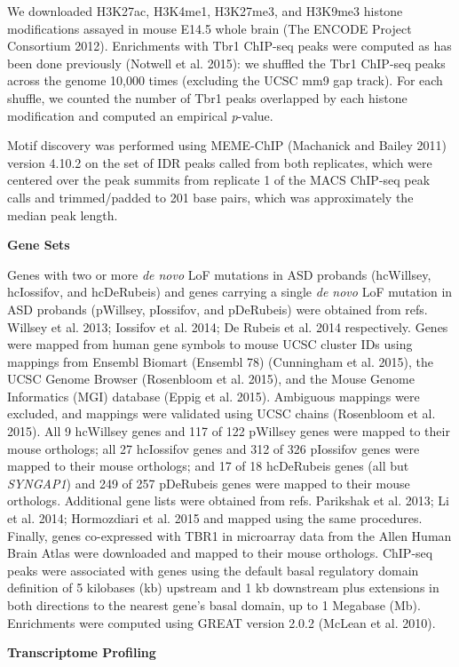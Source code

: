 \documentclass[]{article}
\begin{document}
We downloaded H3K27ac, H3K4me1, H3K27me3, and H3K9me3 histone
modifications assayed in mouse E14.5 whole brain (The ENCODE Project
Consortium 2012). Enrichments with Tbr1 ChIP-seq peaks were computed as
has been done previously (Notwell et al. 2015): we shuffled the Tbr1
ChIP-seq peaks across the genome 10,000 times (excluding the UCSC mm9
gap track). For each shuffle, we counted the number of Tbr1 peaks
overlapped by each histone modification and computed an empirical
\emph{p}-value.

Motif discovery was performed using MEME-ChIP (Machanick and Bailey
2011) version 4.10.2 on the set of IDR peaks called from both
replicates, which were centered over the peak summits from replicate 1
of the MACS ChIP-seq peak calls and trimmed/padded to 201 base pairs,
which was approximately the median peak length.

\textbf{Gene Sets}

Genes with two or more \emph{de novo} LoF mutations in ASD probands
(hcWillsey, hcIossifov, and hcDeRubeis) and genes carrying a single
\emph{de novo} LoF mutation in ASD probands (pWillsey, pIossifov, and
pDeRubeis) were obtained from refs. Willsey et al. 2013; Iossifov et al.
2014; De Rubeis et al. 2014 respectively. Genes were mapped from human
gene symbols to mouse UCSC cluster IDs using mappings from Ensembl
Biomart (Ensembl 78) (Cunningham et al. 2015), the UCSC Genome Browser
(Rosenbloom et al. 2015), and the Mouse Genome Informatics (MGI)
database (Eppig et al. 2015). Ambiguous mappings were excluded, and
mappings were validated using UCSC chains (Rosenbloom et al. 2015). All
9 hcWillsey genes and 117 of 122 pWillsey genes were mapped to their
mouse orthologs; all 27 hcIossifov genes and 312 of 326 pIossifov genes
were mapped to their mouse orthologs; and 17 of 18 hcDeRubeis genes (all
but \emph{SYNGAP1}) and 249 of 257 pDeRubeis genes were mapped to their
mouse orthologs. Additional gene lists were obtained from refs.
Parikshak et al. 2013; Li et al. 2014; Hormozdiari et al. 2015 and
mapped using the same procedures. Finally, genes co-expressed with TBR1
in microarray data from the Allen Human Brain Atlas were downloaded and
mapped to their mouse orthologs. ChIP-seq peaks were associated with
genes using the default basal regulatory domain definition of 5
kilobases (kb) upstream and 1 kb downstream plus extensions in both
directions to the nearest gene's basal domain, up to 1 Megabase (Mb).
Enrichments were computed using GREAT version 2.0.2 (McLean et al.
2010).

\textbf{Transcriptome Profiling}
\end{document}
